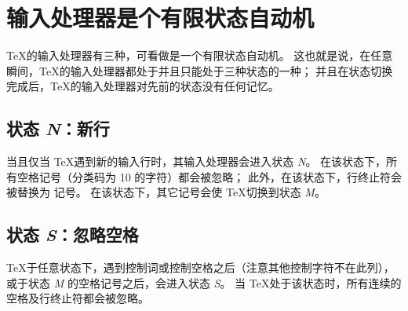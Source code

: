 \documentclass{book}
\begin{document}
\section{输入处理器是个有限状态自动机}
\label{input:states}

\TeX 的输入处理器有三种，可看做是一个有限状态自动机。
这也就是说，在任意瞬间，\TeX 的输入处理器都处于并且只能处于三种状态的一种；
并且在状态切换完成后，\TeX 的输入处理器对先前的状态没有任何记忆。

\subsection{状态 {\itshape N}：新行}

当且仅当 \TeX 遇到新的输入行时，其输入处理器会进入状态 {\itshape N}。
在该状态下，所有空格记号（分类码为 10 的字符）都会被忽略；
此外，在该状态下，行终止符会被替换为  记号。
在该状态下，其它记号会使 \TeX 切换到状态 {\itshape M}。

\subsection{状态 {\itshape S}：忽略空格}

\TeX 于任意状态下，遇到控制词或控制空格之后（注意其他控制字符不在此列），
或于状态 {\itshape M} 的空格记号之后，会进入状态 {\itshape S}。
当 \TeX 处于该状态时，所有连续的空格及行终止符都会被忽略。
\end{document}
